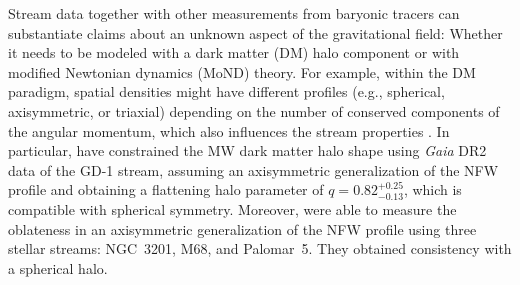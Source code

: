 \documentclass[referee]{aa} %
\begin{document}
Stream data together with other measurements from baryonic tracers can substantiate claims about an unknown aspect of the gravitational field: Whether it needs to be modeled with a dark matter (DM) halo component or with modified Newtonian dynamics (MoND) theory.
For example, within the DM paradigm, spatial densities might have different profiles
(e.g., spherical, axisymmetric, or triaxial) depending on the number of conserved components of the angular momentum, which also influences the stream properties \citep{2013ApJ...773L...4V,2016MNRAS.455.1079P,2020MNRAS.492.4398M}.
In particular, \citet{2019MNRAS.486.2995M} have constrained the MW dark matter halo shape using \textit{Gaia} DR2 data of the GD-1 stream, assuming an axisymmetric generalization of the NFW profile and obtaining a flattening halo parameter of $q=0.82^{+0.25}_{-0.13}$, which is compatible with spherical symmetry.
Moreover, \cite{2023MNRAS.524.2124P} were able to measure the oblateness in an axisymmetric generalization of the NFW profile using three stellar streams: NGC~3201, M68, and Palomar~5. They obtained
consistency with a spherical halo.
\end{document}
